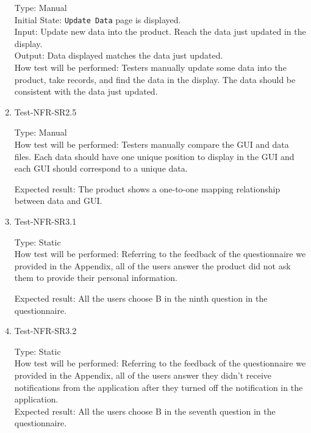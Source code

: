 \documentclass[12pt, titlepage]{article}
\begin{document}
\begin{enumerate}
Type: Manual\\

Initial State: \verb|Update Data| page is displayed.\\

Input: Update new data into the product. Reach the data just updated in the display.\\

Output: Data displayed matches the data just updated.\\

How test will be performed: Testers manually update some data into the product, take records, and find the data in the display. The data should be consistent with the data just updated.

\item{Test-NFR-SR2.5\\}

Type: Manual\\

How test will be performed: Testers manually compare the GUI and data files. Each data should have one unique position to display in the GUI and each GUI should correspond to a unique data. 

Expected result: The product shows a one-to-one mapping relationship between data and GUI. 



\item{Test-NFR-SR3.1\\}

Type: Static\\

How test will be performed: Referring to the feedback of the questionnaire we provided in the Appendix, all of the users answer the product did not ask them to provide their personal information.

Expected result: All the users choose B in the ninth question in the questionnaire.

\item{Test-NFR-SR3.2\\}

Type: Static\\

How test will be performed: Referring to the feedback of the questionnaire we provided in the Appendix, all of the users answer they didn't receive notifications from the application after they turned off the notification in the application.\\

Expected result: All the users choose B in the seventh question in the questionnaire.\\



\end{enumerate}
\end{document}
